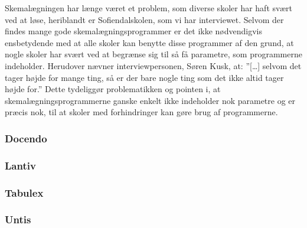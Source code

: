 Skemalægningen har længe været et problem, som diverse skoler har haft svært ved at løse, heriblandt er Sofiendalskolen, som vi har interviewet.
Selvom der findes mange gode skemalægningsprogrammer er det ikke nødvendigvis ensbetydende med at alle skoler kan benytte disse programmer af den grund, at nogle skoler har svært ved at begrænse sig til så få parametre, som programmerne indeholder. Herudover nævner interviewpersonen, Søren Kusk, at: ”[…] selvom det tager højde for mange ting, så er der bare nogle ting som det ikke altid tager højde for.” Dette tydeliggør problematikken og pointen i, at skemalægningsprogrammerne ganske enkelt ikke indeholder nok parametre og er præcis nok, til at skoler med forhindringer kan gøre brug af programmerne. 

  \subsubsection{Docendo}
    

  \subsubsection{Lantiv}
    

  \subsubsection{Tabulex}
    

  \subsubsection{Untis}
    